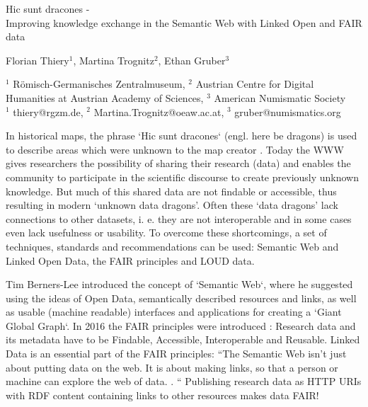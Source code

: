 \documentclass[a4paper]{article}
\begin{document}

\Large
 \begin{center}
Hic sunt dracones -\\ Improving knowledge exchange in the Semantic Web with Linked Open and FAIR data\\ 

\hspace{10pt}

\large
Florian Thiery$^1$, Martina Trognitz$^2$, Ethan Gruber$^3$\\

\hspace{10pt}

\small  
$^1$ R{\"o}misch-Germanisches Zentralmuseum, $^2$ Austrian Centre for Digital Humanities at Austrian Academy of Sciences, $^3$ American Numismatic Society\\
$^1$ thiery@rgzm.de, $^2$ Martina.Trognitz@oeaw.ac.at, $^3$ gruber@numismatics.org\\

\end{center}

\normalsize

In historical maps, the phrase `Hic sunt dracones` (engl. here be dragons) is used to describe areas which were unknown to the map creator \cite{wuttke_here_2019}. Today the WWW gives researchers the possibility of sharing their research (data) and enables the community to participate in the scientific discourse to create previously unknown knowledge. But much of this shared data are not findable or accessible, thus resulting in modern ‘unknown data dragons’. Often these ‘data dragons’ lack connections to other datasets, i. e. they are not interoperable and in some cases even lack usefulness or usability. To overcome these shortcomings, a set of techniques, standards and recommendations can be used: Semantic Web and Linked Open Data, the FAIR principles and LOUD data.

Tim Berners-Lee introduced the concept of `Semantic Web`, where he suggested using the ideas of Open Data, semantically described resources and links, as well as usable (machine readable) interfaces and applications for creating a `Giant Global Graph`. In 2016 the FAIR principles were introduced \cite{wilkinson_fair_2016}: Research data and its metadata have to be Findable, Accessible, Interoperable and Reusable. Linked Data is an essential part of the FAIR principles: “The Semantic Web isn't just about putting data on the web. It is about making links, so that a person or machine can explore the web of data. \cite{berners-lee_linked_2006}. “ Publishing research data as HTTP URIs with RDF content containing links to other resources makes data FAIR! 
\end{document}
